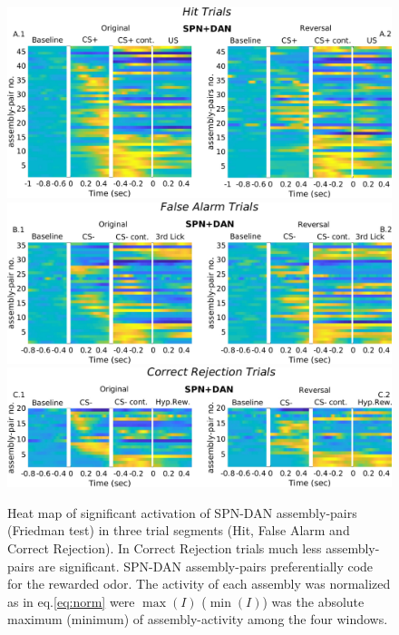 \begin{figure}[H]
\centering
\includegraphics[scale=0.33]{figures/SPN_DANHit.pdf}
\includegraphics[scale=0.33]{figures/HeatFA_SPN_DAN.pdf}
\includegraphics[scale=0.33]{figures/HeatCR_SPN_DAN.pdf}
\caption{Heat map of significant activation of SPN-DAN assembly-pairs (Friedman test) in three trial segments (Hit, False Alarm and Correct Rejection). In Correct Rejection trials much less assembly-pairs are significant. SPN-DAN assembly-pairs preferentially code for the rewarded odor. The activity of each assembly was normalized as in eq.\ref{eq:norm} were $\max(I)$ ($\min(I)$) was the absolute maximum (minimum) of assembly-activity among the four windows.}
\label{fig:HeatSPN_DANComp}
\end{figure}
